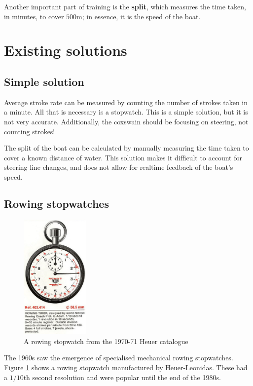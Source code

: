 \documentclass[11pt,twoside,a4paper]{report}
\begin{document}
Another important part of training is the \textbf{split}, which measures the time taken, in minutes, to cover $500\si{\metre}$; in essence, it is the speed of the boat. 

\section{Existing solutions}

\subsection{Simple solution}

Average stroke rate can be measured by counting the number of strokes taken in a minute. All that is necessary is  a stopwatch. This is a simple solution, but it is not very accurate. Additionally, the coxswain should be focusing on steering, not counting strokes!

The split of the boat can be calculated by manually measuring the time taken to cover a known distance of water. This solution makes it difficult to account for steering line changes, and does not allow for realtime feedback of the boat's speed.

\subsection{Rowing stopwatches}

\begin{figure}[ht]
  \centering
  \includegraphics[width=0.3\textwidth]{rowing-stopwatch-heuer.jpg}
  \caption{A rowing stopwatch from the 1970-71 Heuer catalogue \cite{heuers_on_the_sea}}
  \label{fig:rowing-stopwatch-heuer}
\end{figure}

The 1960s saw the emergence of specialised mechanical rowing stopwatches. Figure \ref{fig:rowing-stopwatch-heuer} shows a rowing stopwatch manufactured by Heuer-Leonidas. These had a $1/10$th second resolution and were popular until the end of the 1980s.
\end{document}
